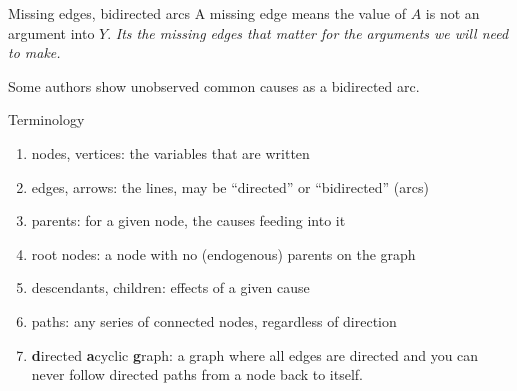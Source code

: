 \documentclass[xcolor=dvipsnames]{beamer}
\begin{document}
\begin{frame}{Missing edges, bidirected arcs}
\small        
         A missing edge means the value of $A$ is not an argument into $Y$. \textit{Its the missing edges that matter for the arguments we will need to make.}\\
        \bigskip
        \begin{center}
\end{center}
         Some authors show unobserved common causes as a bidirected arc. \\
\end{frame}

\begin{frame}{Terminology}
\begin{enumerate}
\item<1-> nodes, vertices: the variables that are written
\item<2-> edges, arrows: the lines,  may be ``directed'' or ``bidirected'' (arcs)
\item<3-> parents: for a given node, the causes feeding into it
\item<4-> root nodes: a node with no (endogenous) parents on the graph
\item<5-> descendants, children: effects of a given cause
\item<6-> paths: any series of connected nodes, regardless of direction
\item<6-> \textbf{d}irected \textbf{a}cyclic \textbf{g}raph: a graph where all edges are directed and you can never follow directed paths from a node back to itself.
\end{enumerate}
\end{frame}
\end{document}
